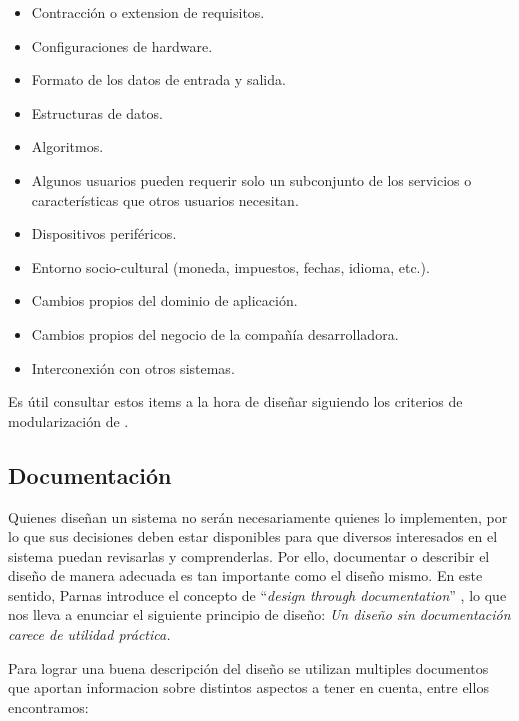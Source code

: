 \begin{itemize}
	\item Contracción o extension de requisitos.
	\item Configuraciones de hardware.
	\item Formato de los datos de entrada y salida.
	\item Estructuras de datos.
	\item Algoritmos.
	\item Algunos usuarios pueden requerir solo un subconjunto de los servicios o características que otros usuarios necesitan.
	\item Dispositivos periféricos.
	\item Entorno socio-cultural (moneda, impuestos, fechas, idioma, etc.).
	\item Cambios propios del dominio de aplicación.
	\item Cambios propios del negocio de la compañía desarrolladora.
	\item Interconexión con otros sistemas.
\end{itemize}

Es útil consultar estos items a la hora de diseñar siguiendo los criterios de modularización de \cite{Parnas1972}.

\subsection{Documentación}

Quienes diseñan un sistema no serán necesariamente quienes lo implementen, por lo que sus decisiones deben estar disponibles para que diversos interesados en el sistema puedan revisarlas y comprenderlas. Por ello, documentar o describir el diseño de manera adecuada es tan importante como el diseño mismo. En este sentido, Parnas introduce el concepto de ``\textit{design through documentation}'' \cite{parnasDoc}, lo que nos lleva a enunciar el siguiente principio de diseño: \textit{Un diseño sin documentación carece de utilidad práctica.}

Para lograr una buena descripción del diseño se utilizan multiples documentos que aportan informacion sobre distintos aspectos a tener en cuenta, entre ellos encontramos:

